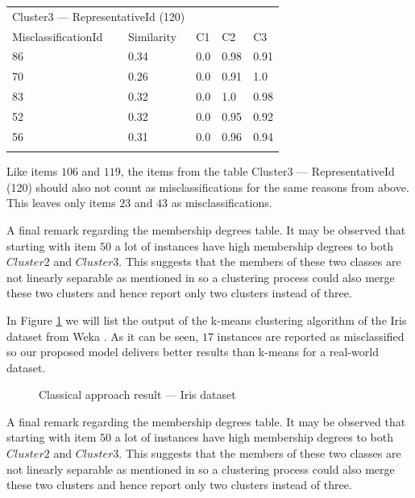 \begin{tabular}{lllll}
\hline
\multicolumn{2}{c}{Cluster3 --- RepresentativeId (120)} \\
\cline{1-5}
MisclassificationId & Similarity   & C1 & C2 & C3\\ 
\hline
86 & 0.34 & 0.0 &    0.98 &   0.91\\
70 & 0.26  & 0.0 &   0.91 &  1.0\\
83 & 0.32 & 0.0 &  1.0 &  0.98\\
52 & 0.32 & 0.0 &   0.95 &  0.92\\
56 & 0.31 & 0.0 &   0.96 &  0.94\\
\hline\\
\end{tabular} 

Like items $106$ and $119$, the items from the table Cluster3 --- RepresentativeId (120) should also not count as misclassifications for the same reasons from above. This leaves only items $23$ and $43$ as misclassifications.

A final remark regarding the membership degrees table. It may be observed that starting with item $50$ a lot of instances have high membership degrees to both $Cluster2$ and $Cluster3$. This suggests that the  members of these two classes are not linearly separable as mentioned in \cite{website:iris} so a clustering process could also merge these two clusters and hence report only two clusters instead of three. 

In Figure \ref{weka_iris} we will list the output of the k-means clustering algorithm of the Iris dataset \cite{website:iris} from Weka \cite{Hall09Weka}. As it can be seen, $17$ instances are reported as misclassified so our proposed model delivers better results than k-means for a real-world dataset.

\begin{figure}[h!]
\centerline{}
      \caption{Classical approach result --- Iris dataset}
\label{weka_iris}
\end{figure}


A final remark regarding the membership degrees table. It may be observed that starting with item $50$ a lot of instances have high membership degrees to both $Cluster2$ and $Cluster3$. This suggests that the  members of these two classes are not linearly separable as mentioned in \cite{website:iris} so a clustering process could also merge these two clusters and hence report only two clusters instead of three. 


